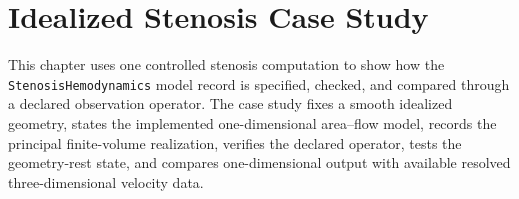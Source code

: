 \section{Idealized Stenosis Case Study}
\label{sec:case-study}
\label{sec:idealized-stenosis-case-study}

This chapter uses one controlled stenosis computation to show how the
\texttt{StenosisHemodynamics} model record is specified, checked, and compared
through a declared observation operator. The case study fixes a smooth
idealized geometry, states the implemented one-dimensional area--flow model,
records the principal finite-volume realization, verifies the declared
operator, tests the geometry-rest state, and compares one-dimensional output
with available resolved three-dimensional velocity data.



\FloatBarrier



\FloatBarrier



\FloatBarrier
